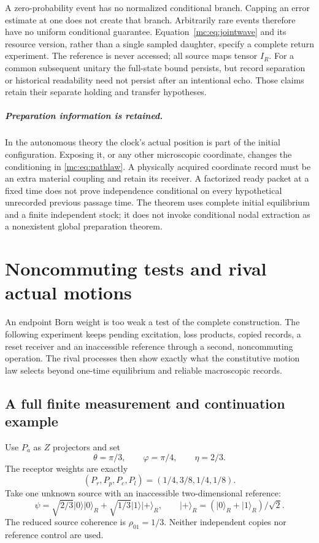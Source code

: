 \documentclass[11pt,oneside,openany]{book}
\theoremstyle{definition}
\theoremstyle{remark}\newtheorem{remark}[theorem]{Remark}
\providecommand{\ket}[1]{\lvert#1\rangle}
\begin{document}
A zero-probability event has no normalized conditional branch. Capping an
error estimate at one does not create that branch. Arbitrarily rare
events therefore have no uniform conditional guarantee.
Equation~\eqref{mc:eq:jointwave} and its resource version, rather than a
single sampled daughter, specify a complete return experiment.
The reference is never accessed; all source maps tensor $I_R$.
For a common subsequent unitary the full-state bound persists, but
record separation or historical readability need not persist after an
intentional echo. Those claims retain their separate holding and transfer
hypotheses.

\paragraph{Preparation information is retained.}
In the autonomous theory the clock's actual position is part of the initial configuration. Exposing it, or any other microscopic coordinate, changes the conditioning in \eqref{mc:eq:pathlaw}. A physically acquired coordinate record must be an extra material coupling and retain its receiver. A factorized ready packet at a fixed time does not prove independence conditional on every hypothetical unrecorded previous passage time. The theorem uses complete initial equilibrium and a finite independent stock; it does not invoke conditional nodal extraction as a nonexistent global preparation theorem.

\chapter{Noncommuting tests and rival actual motions}
\label{mc:chapter-tests}

An endpoint Born weight is too weak a test of the complete construction.
The following experiment keeps pending excitation, loss products, copied
records, a reset receiver and an inaccessible reference through a second,
noncommuting operation. The rival processes then show exactly what the
constitutive motion law selects beyond one-time equilibrium and reliable
macroscopic records.

\section{A full finite measurement and continuation example}
\label{mc:sec:example}
Use $P_a$ as $Z$ projectors and set
\[
 \theta=\pi/3,\qquad\varphi=\pi/4,\qquad\eta=2/3.
\]
The receptor weights are exactly
\begin{equation}\label{mc:eq:exampleweights}
 (P_r,P_p,P_c,P_l)=(1/4,3/8,1/4,1/8).
\end{equation}
Take one unknown source with an inaccessible two-dimensional reference:
\begin{equation}\label{mc:eq:inputexample}
 \psi=\sqrt{2/3}\ket0\ket0_R+
                       \sqrt{1/3}\ket1\ket+_R,\qquad
 \ket+_R=(\ket0_R+\ket1_R)/\sqrt2.
\end{equation}
The reduced source coherence is $\rho_{01}=1/3$. Neither independent copies nor reference control are used.
\end{document}
